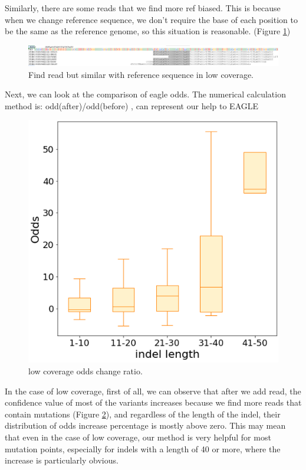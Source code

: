 Similarly, there are some reads that we find more ref biased. This is because when we change reference sequence, we don't require the base of each position to be the same as the reference genome, so this situation is reasonable. (Figure \ref{f4-4})

\vspace{1cm}
\begin{figure}[H]
    \centering
    \includegraphics[width=1\columnwidth]{body/image/4-4.png}
    \captionsetup{labelfont=bf}
    \renewcommand{\baselinestretch}{1.0}
    \vspace{-1cm}
    \caption[Find reference reads in low coverage]{Find read but similar with reference sequence in low coverage.}
    \label{f4-4}
\end{figure}

Next, we can look at the comparison of eagle odds. 
The numerical calculation method is:
odd(after)/odd(before)
, can represent our help to EAGLE

\vspace{1cm}
\begin{figure}[H]
    \centering
    \includegraphics[width=0.6\columnwidth]{body/image/4-5.png}
    \captionsetup{labelfont=bf}
    \renewcommand{\baselinestretch}{1.0}
    \caption[low coverage odds change ratio]{low coverage odds change ratio.}
    \label{f4-5}
\end{figure}

In the case of low coverage, first of all, we can observe that after we add read, the confidence value of most of the variants increases because we find more reads that contain mutations (Figure \ref{f4-5}), and regardless of the length of the indel, their distribution of odds increase percentage is mostly above zero.
This may mean that even in the case of low coverage, our method is very helpful for most mutation points, especially for indels with a length of 40 or more, where the increase is particularly obvious.


